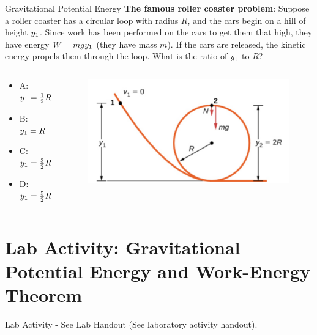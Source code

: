 \documentclass{beamer}
\begin{document}
\begin{frame}{Gravitational Potential Energy}
\textbf{The famous roller coaster problem}: Suppose a roller coaster has a circular loop with radius $R$, and the cars begin on a hill of height $y_{\rm 1}$.  Since work has been performed on the cars to get them that high, they have energy $W = mgy_{\rm 1}$ (they have mass $m$).  If the cars are released, the kinetic energy propels them through the loop.  What is the ratio of $y_{\rm 1}$ to $R$?
\begin{columns}[T]
\begin{column}{0.5\textwidth}
\begin{itemize}
\item A: $y_{\rm 1} = \frac{1}{2}R$
\item B: $y_{\rm 1} = R$
\item C: $y_{\rm 1} = \frac{3}{2}R$
\item D: $y_{\rm 1} = \frac{5}{2}R$
\end{itemize}
\end{column}
\begin{column}{0.5\textwidth}
\begin{figure}
\centering
\includegraphics[width=\textwidth]{figures/loop.png}
\end{figure}
\end{column}
\end{columns}
\end{frame}

\section{Lab Activity: Gravitational Potential Energy and Work-Energy Theorem}

\begin{frame}{Lab Activity - See Lab Handout}
(See laboratory activity handout).
\end{frame}
\end{document}
